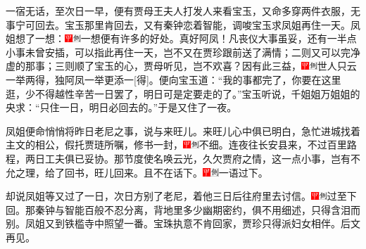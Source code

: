 一宿无话，至次日一早，便有贾母王夫人打发人来看宝玉，又命多穿两件衣服，无事宁可回去。宝玉那里肯回去，又有秦钟恋着智能，调唆宝玉求凤姐再住一天。凤姐想了一想：{\includegraphics[width=3mm]{../Images/00002}\includegraphics[width=3mm]{../Images/00011}\footnotesize \kaishu 一想便有许多的好处。真好阿凤！}凡丧仪大事虽妥，还有一半点小事未曾安插，可以指此再住一天，岂不又在贾珍跟前送了满情；二则又可以完净虚的那事；三则顺了宝玉的心，贾母听见，岂不欢喜？因有此三益，{\includegraphics[width=3mm]{../Images/00002}\includegraphics[width=3mm]{../Images/00011}\footnotesize \kaishu 世人只云一举两得，独阿凤一举更添一{[}得{]}。}便向宝玉道：``我的事都完了，你要在这里逛，少不得越性辛苦一日罢了，明日可是定要走的了。''宝玉听说，千姐姐万姐姐的央求：``只住一日，明日必回去的。''于是又住了一夜。

凤姐便命悄悄将昨日老尼之事，说与来旺儿。来旺儿心中俱已明白，急忙进城找着主文的相公，假托贾琏所嘱，修书一封，{\includegraphics[width=3mm]{../Images/00002}\includegraphics[width=3mm]{../Images/00011}\footnotesize \kaishu 不细。}连夜往长安县来，不过百里路程，两日工夫俱已妥协。那节度使名唤云光，久欠贾府之情，这一点小事，岂有不允之理，给了回书，旺儿回来。且不在话下。{\includegraphics[width=3mm]{../Images/00002}\includegraphics[width=3mm]{../Images/00011}\footnotesize \kaishu 一语过下。}

却说凤姐等又过了一日，次日方别了老尼，着他三日后往府里去讨信。{\includegraphics[width=3mm]{../Images/00002}\includegraphics[width=3mm]{../Images/00011}\footnotesize \kaishu 过至下回。}那秦钟与智能百般不忍分离，背地里多少幽期密约，俱不用细述，只得含泪而别。凤姐又到铁槛寺中照望一番。宝珠执意不肯回家，贾珍只得派妇女相伴。后文再见。

